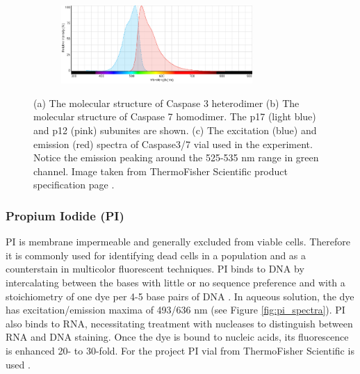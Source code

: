 \documentclass[pdftex,12pt,a4paper]{report}
\begin{document}
\begin{figure}[H]
\centering

\begin{subfigure}{\textwidth}
  \centering
  \includegraphics[width=0.8\textwidth]{images/caspase37_spectra}
  \caption{}
  \label{fig:caspase_spectra}
\end{subfigure}%

\caption[The structure and mechanism of Caspase 3/7]{(a) The molecular structure of Caspase 3 heterodimer (b) The molecular structure of Caspase 7 homodimer. The p17 (light blue) and p12 (pink) subunites are shown. (c) The excitation (blue) and emission (red) spectra of Caspase3/7 vial used in the experiment. Notice the emission peaking around the 525-535 nm range in green channel. Image taken from ThermoFisher Scientific product specification page \cite{thermofisher2018casp}.}

\label{fig:caspase_stain}
\end{figure}

\subsubsection*{Propium Iodide (PI)}

PI is membrane impermeable and generally excluded from viable cells. Therefore it is commonly used for identifying dead cells in a population and as a counterstain in multicolor fluorescent techniques. PI binds to DNA by intercalating between the bases with little or no sequence preference and with a stoichiometry of one dye per 4-5 base pairs of DNA \cite{suzuki1997dna}.  In aqueous solution, the dye has excitation/emission maxima of 493/636 nm (see Figure \ref{fig:pi_spectra}). PI also binds to RNA, necessitating treatment with nucleases to distinguish between RNA and DNA staining. Once the dye is bound to nucleic acids, its fluorescence is enhanced 20- to 30-fold. For the project PI vial from ThermoFisher Scientific is used \cite{thermofisher2018pi}.
\end{document}
